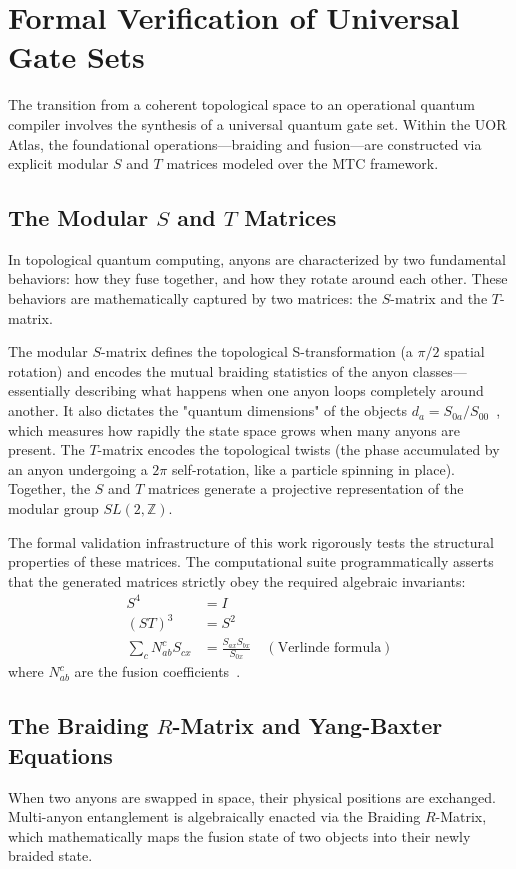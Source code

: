 \section{Formal Verification of Universal Gate Sets}

The transition from a coherent topological space to an operational quantum compiler involves the synthesis of a universal quantum gate set. Within the UOR Atlas, the foundational operations---braiding and fusion---are constructed via explicit modular $S$ and $T$ matrices modeled over the MTC framework.

\subsection{The Modular \texorpdfstring{$S$}{S} and \texorpdfstring{$T$}{T} Matrices}
In topological quantum computing, anyons are characterized by two fundamental behaviors: how they fuse together, and how they rotate around each other. These behaviors are mathematically captured by two matrices: the $S$-matrix and the $T$-matrix.

The modular $S$-matrix defines the topological S-transformation (a $\pi/2$ spatial rotation) and encodes the mutual braiding statistics of the anyon classes—essentially describing what happens when one anyon loops completely around another. It also dictates the "quantum dimensions" of the objects $d_a = S_{0a}/S_{00}$~\cite{rowell2009}, which measures how rapidly the state space grows when many anyons are present. The $T$-matrix encodes the topological twists (the phase accumulated by an anyon undergoing a $2\pi$ self-rotation, like a particle spinning in place). Together, the $S$ and $T$ matrices generate a projective representation of the modular group $SL(2, \mathbb{Z})$.

The formal validation infrastructure of this work rigorously tests the structural properties of these matrices. The computational suite programmatically asserts that the generated matrices strictly obey the required algebraic invariants:
\begin{align}
    S^4 &= I \\
    {(ST)}^3 &= S^2 \\
    \sum_c N_{ab}^c S_{cx} &= \frac{S_{ax}S_{bx}}{S_{0x}} \quad (\text{Verlinde formula})
\end{align}
where $N_{ab}^c$ are the fusion coefficients~\cite{verlinde1988}.

\subsection{The Braiding \texorpdfstring{$R$}{R}-Matrix and Yang-Baxter Equations}
When two anyons are swapped in space, their physical positions are exchanged. Multi-anyon entanglement is algebraically enacted via the Braiding $R$-Matrix, which mathematically maps the fusion state of two objects into their newly braided state. 

